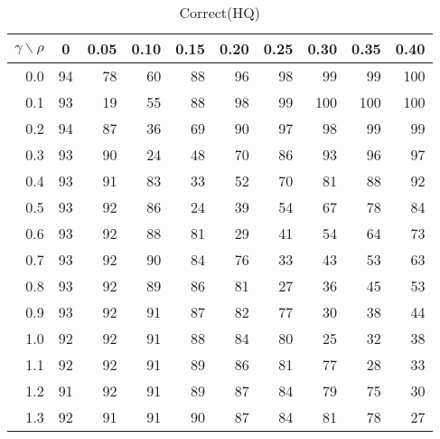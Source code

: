 \documentclass[12pt]{article}
\begin{document}
%


\begin{table}[!tbp]
\caption{Correct(HQ)}
 \begin{center}
 \begin{tabular}{r|rrrrrrrrr}\hline\hline
\multicolumn{1}{c|}{$\gamma\backslash\rho$}&\multicolumn{1}{c}{0}&\multicolumn{1}{c}{0.05}&\multicolumn{1}{c}{0.10}&\multicolumn{1}{c}{0.15}&\multicolumn{1}{c}{0.20}&\multicolumn{1}{c}{0.25}&\multicolumn{1}{c}{0.30}&\multicolumn{1}{c}{0.35}&\multicolumn{1}{c}{0.40}\tabularnewline
\hline




0.0&94&78&60&88&96&98& 99& 99&100\tabularnewline
0.1&93&19&55&88&98&99&100&100&100\tabularnewline
0.2&94&87&36&69&90&97& 98& 99& 99\tabularnewline
0.3&93&90&24&48&70&86& 93& 96& 97\tabularnewline
0.4&93&91&83&33&52&70& 81& 88& 92\tabularnewline
0.5&93&92&86&24&39&54& 67& 78& 84\tabularnewline
0.6&93&92&88&81&29&41& 54& 64& 73\tabularnewline
0.7&93&92&90&84&76&33& 43& 53& 63\tabularnewline
0.8&93&92&89&86&81&27& 36& 45& 53\tabularnewline
0.9&93&92&91&87&82&77& 30& 38& 44\tabularnewline
1.0&92&92&91&88&84&80& 25& 32& 38\tabularnewline
1.1&92&92&91&89&86&81& 77& 28& 33\tabularnewline
1.2&91&92&91&89&87&84& 79& 75& 30\tabularnewline
1.3&92&91&91&90&87&84& 81& 78& 27\tabularnewline
\hline
\end{tabular}

\end{center}

\end{table}

%
\end{document}
